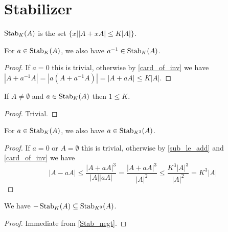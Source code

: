 \chapter{Stabilizer}
\label{chap:stab}

\begin{definition}
    \label{Stab}
    \leanok
    $\operatorname{\operatorname{Stab}}_K(A)$ is the set $\{x | |A + x A| \leq K |A|\}$.
\end{definition}

\begin{lemma}
    \label{Stab_invt}
    \leanok
    For $a \in \operatorname{\operatorname{Stab}}_K(A)$, we also have $a^{-1} \in \operatorname{\operatorname{Stab}}_K(A)$.
\end{lemma}

\begin{proof}
    \leanok
    If $a = 0$ this is trivial, otherwise by \ref{card_of_inv} we have $|A + a^{-1}A| = |a(A + a^{-1}A)| = |A + a A| \leq K |A|$.
\end{proof}

\begin{lemma}
    \label{one_le_of_mem}
    \leanok
    If $A \neq \emptyset$ and $a \in \operatorname{\operatorname{Stab}}_K(A)$ then $1 \leq K$.
\end{lemma}

\begin{proof}
    \leanok
    Trivial.
\end{proof}

\begin{lemma}
    \label{Stab_negt}
    \leanok
    For $a \in \operatorname{\operatorname{Stab}}_K(A)$, we also have $a \in \operatorname{\operatorname{Stab}}_{K^3}(A)$.
\end{lemma}

\begin{proof}
    \leanok
    If $a = 0$ or $A = \emptyset$ this is trivial, otherwise by \ref{sub_le_add} and \ref{card_of_inv} we have
    $$|A - a A| \leq \frac{|A + aA|^3}{|A| |a A|} = \frac{|A + aA|^3}{|A|^2} \leq \frac{K^3 |A|^3}{|A|^2} = K^3 |A|$$
\end{proof}

\begin{lemma}
    \label{Stab_neg}
    \leanok
    We have $-\operatorname{\operatorname{Stab}}_{K}(A) \subseteq \operatorname{\operatorname{Stab}}_{K^3}(A)$.
\end{lemma}

\begin{proof}
    \leanok
    Immediate from \ref{Stab_negt}.
\end{proof}

